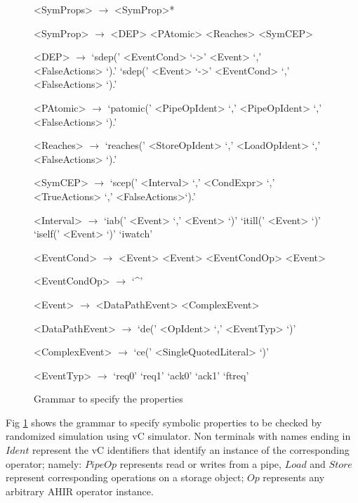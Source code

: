 \documentclass[12pt,a4paper]{article}
\begin{document}
\begin{figure}
\begin{grammar}
<SymProps>      $\rightarrow$ <SymProp>*

<SymProp>       $\rightarrow$ <DEP>
                \alt          <PAtomic>
                \alt          <Reaches>
                \alt          <SymCEP>

<DEP>           $\rightarrow$ `sdep(' <EventCond> `->' <Event> `,' <FalseActions> `).'
                \alt          `sdep(' <Event> `->' <EventCond> `,' <FalseActions> `).'

<PAtomic>       $\rightarrow$ `patomic(' <PipeOpIdent> `,' <PipeOpIdent> `,' <FalseActions> `).'

<Reaches>       $\rightarrow$ `reaches(' <StoreOpIdent> `,' <LoadOpIdent> `,' <FalseActions> `).'

<SymCEP>        $\rightarrow$ `scep(' <Interval> `,' <CondExpr> `,' <TrueActions> `,' <FalseActions>`).'

<Interval>      $\rightarrow$ `iab(' <Event> `,' <Event> `)'
                \alt          `itill(' <Event> `)'
                \alt          `iself(' <Event> `)'
                \alt          `iwatch'

<EventCond>     $\rightarrow$ <Event>
                \alt          <Event> <EventCondOp> <Event>

<EventCondOp>   $\rightarrow$ `^'

<Event>         $\rightarrow$ <DataPathEvent>
                \alt          <ComplexEvent>

<DataPathEvent> $\rightarrow$ `de(' <OpIdent> `,' <EventTyp> `)'

<ComplexEvent>  $\rightarrow$ `ce(' <SingleQuotedLiteral> `)'

<EventTyp>      $\rightarrow$ `req0'
                \alt          `req1'
                \alt          `ack0'
                \alt          `ack1'
                \alt          `ftreq'

\end{grammar}
\caption{Grammar to specify the properties}
\label{Fig:PropGrammar}
\end{figure}

Fig \ref{Fig:PropGrammar} shows the grammar to specify symbolic properties to be checked by randomized simulation using vC simulator. Non terminals with names ending in $Ident$ represent the vC identifiers that identify an instance of the corresponding operator; namely: $PipeOp$ represents read or writes from a pipe, $Load$ and $Store$ represent corresponding operations on a storage object; $Op$ represents any arbitrary AHIR operator instance.
\end{document}
